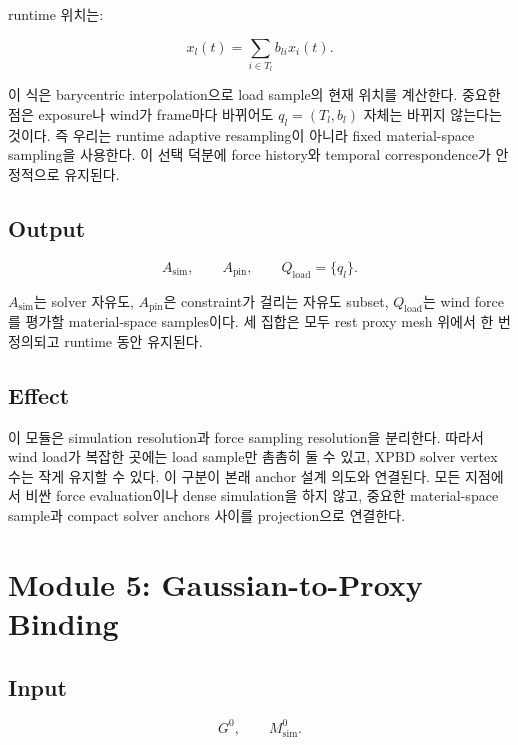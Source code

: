 \documentclass[11pt,a4paper]{article}
\begin{document}
runtime 위치는:

\begin{equation}
x_l(t)=\sum_{i\in T_l}b_{li}x_i(t).
\end{equation}

이 식은 barycentric interpolation으로 load sample의 현재 위치를 계산한다.
중요한 점은 exposure나 wind가 frame마다 바뀌어도 $q_l=(T_l,b_l)$ 자체는 바뀌지 않는다는 것이다.
즉 우리는 runtime adaptive resampling이 아니라 fixed material-space sampling을 사용한다.
이 선택 덕분에 force history와 temporal correspondence가 안정적으로 유지된다.

\subsection*{Output}

\begin{equation}
A_{\mathrm{sim}},\qquad A_{\mathrm{pin}},\qquad Q_{\mathrm{load}}=\{q_l\}.
\end{equation}

$A_{\mathrm{sim}}$는 solver 자유도, $A_{\mathrm{pin}}$은 constraint가 걸리는 자유도 subset, $Q_{\mathrm{load}}$는 wind force를 평가할 material-space samples이다.
세 집합은 모두 rest proxy mesh 위에서 한 번 정의되고 runtime 동안 유지된다.

\subsection*{Effect}

이 모듈은 simulation resolution과 force sampling resolution을 분리한다. 따라서 wind load가 복잡한 곳에는 load sample만 촘촘히 둘 수 있고, XPBD solver vertex 수는 작게 유지할 수 있다.
이 구분이 본래 anchor 설계 의도와 연결된다.
모든 지점에서 비싼 force evaluation이나 dense simulation을 하지 않고, 중요한 material-space sample과 compact solver anchors 사이를 projection으로 연결한다.

\section{Module 5: Gaussian-to-Proxy Binding}

\subsection*{Input}

\begin{equation}
G^0,\qquad M_{\mathrm{sim}}^0.
\end{equation}
\end{document}
